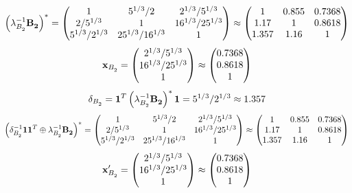 \documentclass[10pt,a4paper]{article}
\begin{document}
	\[
		\left(\lambda_{B_2^{}}^{-1}\bold{B_2^{}}\right)^* = 
		\begin{pmatrix}
			{1}{} & {{5^ {1 / 3}}} / {{2}} & {{2^ {1 / 3}}} / {{5^ {1 / 3}}} \\
			{{2}} / {{5^ {1 / 3}}} & {1}{} & {{16^ {1 / 3}}} / {{25^ {1 / 3}}} \\
			{{5^ {1 / 3}}} / {{2^ {1 / 3}}} & {{25^ {1 / 3}}} / {{16^ {1 / 3}}} & {1}{} \\
		\end{pmatrix}
		\approx
		\begin{pmatrix}
			1        & 0.855    & 0.7368   \\
			1.17     & 1        & 0.8618   \\
			1.357    & 1.16     & 1        \\
		\end{pmatrix}
	\]
	\[
		\bold{x}_{B_2^{}} = 
		\begin{pmatrix}
			{{2^ {1 / 3}}} / {{5^ {1 / 3}}} \\
			{{16^ {1 / 3}}} / {{25^ {1 / 3}}} \\
			{1}{} \\
		\end{pmatrix}
		\approx
		\begin{pmatrix}
			0.7368   \\
			0.8618   \\
			1        \\
		\end{pmatrix}
	\]
	\[
		\delta_{B_2^{}} = \bold{1}^T \left(\lambda_{B_2^{}}^{-1}\bold{B_2^{}}\right)^* \bold{1} = {{5^ {1 / 3}}} / {{2^ {1 / 3}}}\approx 1.357
	\]
	\[
		\left(\delta_{B_2^{}}^{-1}\bold{11}^T \oplus \lambda_{B_2^{}}^{-1}\bold{B_2^{}}\right)^* = 
		\begin{pmatrix}
			{1}{} & {{5^ {1 / 3}}} / {{2}} & {{2^ {1 / 3}}} / {{5^ {1 / 3}}} \\
			{{2}} / {{5^ {1 / 3}}} & {1}{} & {{16^ {1 / 3}}} / {{25^ {1 / 3}}} \\
			{{5^ {1 / 3}}} / {{2^ {1 / 3}}} & {{25^ {1 / 3}}} / {{16^ {1 / 3}}} & {1}{} \\
		\end{pmatrix}
		\approx
		\begin{pmatrix}
			1        & 0.855    & 0.7368   \\
			1.17     & 1        & 0.8618   \\
			1.357    & 1.16     & 1        \\
		\end{pmatrix}
	\]
	\[
		\bold{x}'_{B_2^{}} = 
		\begin{pmatrix}
			{{2^ {1 / 3}}} / {{5^ {1 / 3}}} \\
			{{16^ {1 / 3}}} / {{25^ {1 / 3}}} \\
			{1}{} \\
		\end{pmatrix}
		\approx
		\begin{pmatrix}
			0.7368   \\
			0.8618   \\
			1        \\
		\end{pmatrix}
	\]
\end{document}
